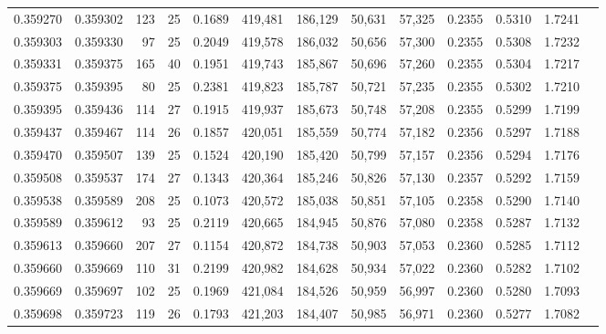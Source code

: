 \begin{tabular}{rrrrrrrrrrrrr}
0.359270 & 0.359302 &   123 &  25 &                                     0.1689 & 419,481 & 186,129 &  50,631 &  57,325 & 0.2355 & 0.5310 & 1.7241 \\
0.359303 & 0.359330 &    97 &  25 &                                     0.2049 & 419,578 & 186,032 &  50,656 &  57,300 & 0.2355 & 0.5308 & 1.7232 \\
0.359331 & 0.359375 &   165 &  40 &                                     0.1951 & 419,743 & 185,867 &  50,696 &  57,260 & 0.2355 & 0.5304 & 1.7217 \\
0.359375 & 0.359395 &    80 &  25 &                                     0.2381 & 419,823 & 185,787 &  50,721 &  57,235 & 0.2355 & 0.5302 & 1.7210 \\
0.359395 & 0.359436 &   114 &  27 &                                     0.1915 & 419,937 & 185,673 &  50,748 &  57,208 & 0.2355 & 0.5299 & 1.7199 \\
0.359437 & 0.359467 &   114 &  26 &                                     0.1857 & 420,051 & 185,559 &  50,774 &  57,182 & 0.2356 & 0.5297 & 1.7188 \\
0.359470 & 0.359507 &   139 &  25 &                                     0.1524 & 420,190 & 185,420 &  50,799 &  57,157 & 0.2356 & 0.5294 & 1.7176 \\
0.359508 & 0.359537 &   174 &  27 &                                     0.1343 & 420,364 & 185,246 &  50,826 &  57,130 & 0.2357 & 0.5292 & 1.7159 \\
0.359538 & 0.359589 &   208 &  25 &                                     0.1073 & 420,572 & 185,038 &  50,851 &  57,105 & 0.2358 & 0.5290 & 1.7140 \\
0.359589 & 0.359612 &    93 &  25 &                                     0.2119 & 420,665 & 184,945 &  50,876 &  57,080 & 0.2358 & 0.5287 & 1.7132 \\
0.359613 & 0.359660 &   207 &  27 &                                     0.1154 & 420,872 & 184,738 &  50,903 &  57,053 & 0.2360 & 0.5285 & 1.7112 \\
0.359660 & 0.359669 &   110 &  31 &                                     0.2199 & 420,982 & 184,628 &  50,934 &  57,022 & 0.2360 & 0.5282 & 1.7102 \\
0.359669 & 0.359697 &   102 &  25 &                                     0.1969 & 421,084 & 184,526 &  50,959 &  56,997 & 0.2360 & 0.5280 & 1.7093 \\
0.359698 & 0.359723 &   119 &  26 &                                     0.1793 & 421,203 & 184,407 &  50,985 &  56,971 & 0.2360 & 0.5277 & 1.7082 \\

\end{tabular}
